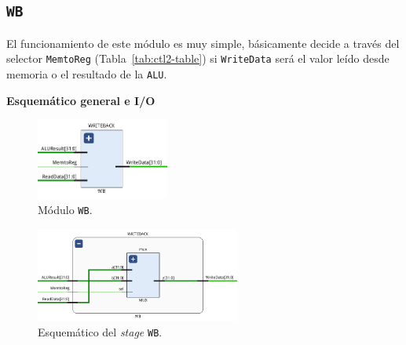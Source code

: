 \documentclass[a4paper]{article}
\begin{document}
\subsection{\texttt{WB}}

El funcionamiento de este módulo es muy simple, básicamente decide a través del selector \texttt{MemtoReg} (Tabla~\ref{tab:ctl2-table}) si \texttt{WriteData} será el valor leído desde memoria o el resultado de la \texttt{ALU}.

\textbf{Esquemático general e I/O}

\begin{figure}[H]
	\begin{center}				
	\includegraphics[width=0.39\textwidth,center]{WB_1.png}
  	\caption{Módulo \texttt{WB}.}
  	\label{fig:funcionamiento.}
  	\end{center}
\end{figure}

\begin{figure}[H]
	\begin{center}				
	\includegraphics[width=0.6\textwidth,center]{WB_2.png}
  	\caption{Esquemático del \textit{stage} \texttt{WB}.}
  	\label{fig:funcionamiento.}
  	\end{center}
\end{figure}

%
\end{document}
